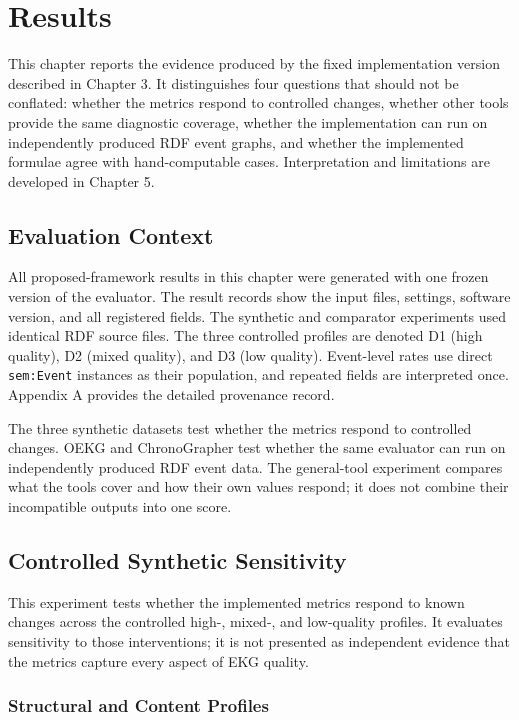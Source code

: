 \chapter{Results}

This chapter reports the evidence produced by the fixed implementation version described in Chapter 3. It distinguishes four questions that should not be conflated: whether the metrics respond to controlled changes, whether other tools provide the same diagnostic coverage, whether the implementation can run on independently produced RDF event graphs, and whether the implemented formulae agree with hand-computable cases. Interpretation and limitations are developed in Chapter 5.

\section{Evaluation Context}

All proposed-framework results in this chapter were generated with one frozen version of the evaluator. The result records show the input files, settings, software version, and all \FrozenCoreMetricCount{} registered fields. The synthetic and comparator experiments used identical RDF source files. The three controlled profiles are denoted D1 (high quality), D2 (mixed quality), and D3 (low quality). Event-level rates use direct \texttt{sem:Event} instances as their population, and repeated fields are interpreted once. Appendix A provides the detailed provenance record.

The three synthetic datasets test whether the metrics respond to controlled changes. OEKG and ChronoGrapher test whether the same evaluator can run on independently produced RDF event data. The general-tool experiment compares what the tools cover and how their own values respond; it does not combine their incompatible outputs into one score.

\section{Controlled Synthetic Sensitivity}

This experiment tests whether the implemented metrics respond to known changes across the controlled high-, mixed-, and low-quality profiles. It evaluates sensitivity to those interventions; it is not presented as independent evidence that the metrics capture every aspect of EKG quality.

\subsection{Structural and Content Profiles}

